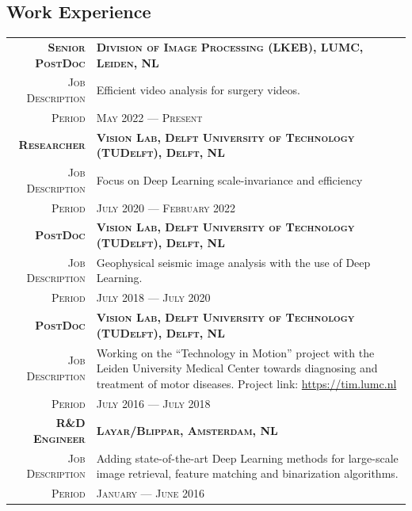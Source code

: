 \documentclass[a4paper, oneside, final]{scrartcl}
\newcommand{\gray}{\rowcolor[gray]{.90}}
\begin{document}
\begin{center}
		\section{Work Experience}
		\begin{tabular}{r@{\hskip 0.3in}p{13.3cm}}
			\gray \textsc{\textbf{Senior PostDoc}} & \textsc{\textbf{Division of Image Processing (LKEB), LUMC, Leiden, NL}}\\
			\textsc{Job Description}            & Efficient video analysis for surgery videos.\\ 
			\textsc{Period}                     & \textsc{May 2022 --- Present} 
            \vspace{5px}\\
			\gray \textsc{\textbf{Researcher}} & \textsc{\textbf{Vision Lab, Delft University of Technology (TUDelft), Delft, NL}}\\
			\textsc{Job Description}            & Focus on Deep Learning scale-invariance and efficiency\\
			\textsc{Period}                     & \textsc{July 2020 --- February 2022} 
            \vspace{5px}\\
			\gray \textsc{\textbf{PostDoc}}     & \textsc{\textbf{Vision Lab, Delft University of Technology (TUDelft), Delft, NL}}\\
			\textsc{Job Description}            & Geophysical seismic image analysis with the use of Deep Learning. \\
			\textsc{Period}                     & \textsc{July 2018 --- July 2020} 
            \vspace{5px}\\
			\gray \textsc{\textbf{PostDoc}}     & \textsc{\textbf{Vision Lab, Delft University of Technology (TUDelft), Delft, NL}}\\
			\textsc{Job Description}            & Working on the ``Technology in Motion'' project with the Leiden University Medical Center 
				towards diagnosing and treatment of motor diseases.
				Project link: \href{https://tim.lumc.nl}{https://tim.lumc.nl}\\
			\textsc{Period}                     & \textsc{July 2016 --- July 2018} 
            \vspace{5px}\\
			\gray \textsc{\textbf{R\&D Engineer}}   & \textsc{\textbf{Layar\slash Blippar, Amsterdam, NL}}\\
			\textsc{Job Description}                &  Adding state-of-the-art Deep Learning methods for large-scale image retrieval, 
				feature matching and binarization algorithms.\\
			\textsc{Period}                         & \textsc{January --- June 2016} 
		\end{tabular}


\end{center}
\end{document}
